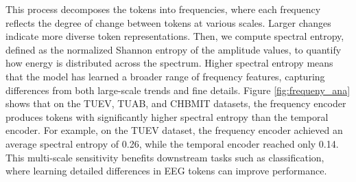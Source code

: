 This process decomposes the tokens into frequencies, where each frequency reflects the degree of change between tokens at various scales. 
Larger changes indicate more diverse token representations.
Then, we compute spectral entropy, defined as the normalized Shannon entropy of the amplitude values, to quantify how energy is distributed across the spectrum. 
Higher spectral entropy means that the model has learned a broader range of frequency features, capturing differences from both large-scale trends and fine details. 
Figure \ref{fig:frequeny_ana} shows that on the TUEV, TUAB, and CHBMIT datasets, the frequency encoder produces tokens with significantly higher spectral entropy than the temporal encoder. 
For example, on the TUEV dataset, the frequency encoder achieved an average spectral entropy of 0.26, while the temporal encoder reached only 0.14. 
This multi-scale sensitivity benefits downstream tasks such as classification, where learning detailed differences in EEG tokens can improve performance.










